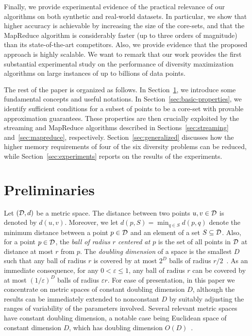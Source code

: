 \documentclass{article}
\renewcommand{\epsilon}{\varepsilon}
\newcommand{\BO}[1]{O\left( #1 \right)}
\begin{document}
Finally, we provide experimental evidence of the practical relevance
of our algorithms on both synthetic and real-world datasets. In
particular, we show that higher accuracy is achievable by increasing
the size of the core-sets, and that the MapReduce algorithm is
considerably faster (up to three orders of magnitude) than its
state-of-the-art competitors.  Also, we provide evidence that the
proposed approach is highly scalable. We want to remark that our work
provides the first substantial experimental study on the performance
of diversity maximization algorithms on large instances of up to
billions of data points.

The rest of the paper is organized as follows.  In
Section~\ref{sec:preliminaries}, we introduce some fundamental
concepts and useful notations. In Section~\ref{sec:basic-properties},
we identify sufficient conditions for a subset of points to be a
core-set with provable approximation guarantees. These properties are
then crucially exploited by the streaming and MapReduce algorithms
described in Sections~\ref{sec:streaming} and~\ref{sec:mapreduce},
respectively. Section~\ref{sec:generalized} discusses how the higher
memory requirements of four of the six diversity problems can be
reduced, while Section~\ref{sec:experiments} reports on the results of
the experiments.

\section{Preliminaries} \label{sec:preliminaries}

Let $({\cal D}, d)$ be a metric space. The distance between two points
$u, v \in {\cal D}$ is denoted by $d(u, v)$.  Moreover, we let
$d(p, S)=\min_{q\in S} d(p, q)$ denote the minimum distance between a
point $p\in {\cal D}$ and an element of a set $S\subseteq {\cal D}$. Also,
for a point $p\in{\cal D}$, the \emph{ball of radius $r$ centered at
  $p$} is the set of all points in ${\cal D}$ at distance at most $r$
from $p$.
The \emph{doubling dimension} of a space is the smallest $D$ such
that any ball of radius $r$ is covered by  at most $2^D$ balls of radius
$r/2$~\cite{GuptaKL03}. As an immediate consequence, for any 
$0<\epsilon\le 1$, any ball of radius $r$ can be covered by at most $(1/\epsilon)^D$ balls
of radius $\epsilon r$. 
For ease of presentation, in this paper we concentrate on metric
spaces of constant doubling dimension $D$, although the results can be
immediately extended to nonconstant $D$ by suitably adjusting the
ranges of variability of the parameters involved. Several relevant
metric spaces have constant doubling dimension, a notable case being 
Euclidean space of  constant dimension $D$, which has doubling dimension
$\BO{D}$~\cite{GuptaKL03}.
\end{document}
